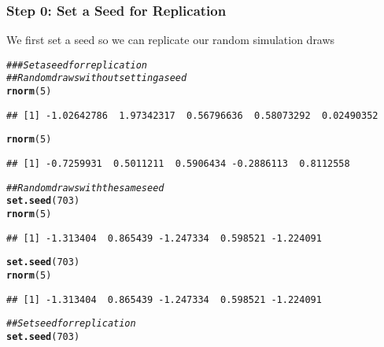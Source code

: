 \documentclass{beamer}\usepackage[]{graphicx}\usepackage[]{color}
\makeatletter
\newcommand{\hlnum}[1]{\textcolor[rgb]{0.686,0.059,0.569}{#1}}%
\newcommand{\hlcom}[1]{\textcolor[rgb]{0.678,0.584,0.686}{\textit{#1}}}%
\newcommand{\hlstd}[1]{\textcolor[rgb]{0.345,0.345,0.345}{#1}}%
\newcommand{\hlkwd}[1]{\textcolor[rgb]{0.737,0.353,0.396}{\textbf{#1}}}%
\newenvironment{kframe}{%
 \def\at@end@of@kframe{}%
 \ifinner\ifhmode%
  \def\at@end@of@kframe{\end{minipage}}%
  \begin{minipage}{\columnwidth}%
 \fi\fi%
 \def\FrameCommand##1{\hskip\@totalleftmargin \hskip-\fboxsep
 \colorbox{shadecolor}{##1}\hskip-\fboxsep
     \hskip-\linewidth \hskip-\@totalleftmargin \hskip\columnwidth}%
 \MakeFramed {\advance\hsize-\width
   \@totalleftmargin\z@ \linewidth\hsize
   \@setminipage}}%
 {\par\unskip\endMakeFramed%
 \at@end@of@kframe}
\newenvironment{knitrout}{}{} %
\makeatother
\begin{document}
\begin{frame}[fragile]\frametitle{Step 0: Set a Seed for Replication}
	We first set a seed so we can replicate our random simulation draws
	\vspace{1ex}
\begin{knitrout}\footnotesize
{}\color{fgcolor}\begin{kframe}
\begin{alltt}
\hlcom{### Set a seed for replication}
\hlcom{## Random draws without setting a seed}
\hlkwd{rnorm}\hlstd{(}\hlnum{5}\hlstd{)}
\end{alltt}
\begin{verbatim}
## [1] -1.02642786  1.97342317  0.56796636  0.58073292  0.02490352
\end{verbatim}
\begin{alltt}
\hlkwd{rnorm}\hlstd{(}\hlnum{5}\hlstd{)}
\end{alltt}
\begin{verbatim}
## [1] -0.7259931  0.5011211  0.5906434 -0.2886113  0.8112558
\end{verbatim}
\begin{alltt}
\hlcom{## Random draws with the same seed}
\hlkwd{set.seed}\hlstd{(}\hlnum{703}\hlstd{)}
\hlkwd{rnorm}\hlstd{(}\hlnum{5}\hlstd{)}
\end{alltt}
\begin{verbatim}
## [1] -1.313404  0.865439 -1.247334  0.598521 -1.224091
\end{verbatim}
\begin{alltt}
\hlkwd{set.seed}\hlstd{(}\hlnum{703}\hlstd{)}
\hlkwd{rnorm}\hlstd{(}\hlnum{5}\hlstd{)}
\end{alltt}
\begin{verbatim}
## [1] -1.313404  0.865439 -1.247334  0.598521 -1.224091
\end{verbatim}
\begin{alltt}
\hlcom{## Set seed for replication}
\hlkwd{set.seed}\hlstd{(}\hlnum{703}\hlstd{)}
\end{alltt}
\end{kframe}
\end{knitrout}
\end{frame}
\end{document}
